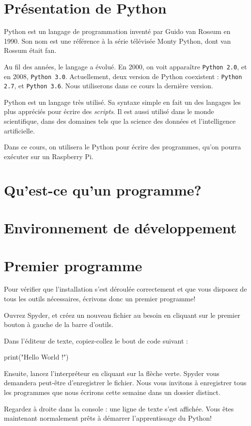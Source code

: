 \section{Présentation de Python}

Python est un langage de programmation inventé par Guido van Rossum en 1990. Son nom est une référence à la série télévisée Monty Python, dont van Rossum était fan.

Au fil des années, le langage a évolué. En 2000, on voit apparaître \texttt{Python 2.0}, et en 2008, \texttt{Python 3.0}.
Actuellement, deux version de Python coexistent : \texttt{Python 2.7}, et \texttt{Python 3.6}. Nous utiliserons dans ce cours la dernière version.

Python est un langage très utilisé. Sa syntaxe simple en fait un des langages les plus appréciés pour écrire des \textit{scripts}. Il est aussi utilisé dans le monde scientifique, dans des domaines tels que la science des données et l'intelligence artificielle.

Dans ce cours, on utilisera le Python pour écrire des programmes, qu'on pourra exécuter sur un Raspberry Pi.

\section{Qu'est-ce qu'un programme?}


\section{Environnement de développement}


\section{Premier programme}
Pour vérifier que l'installation s'est déroulée correctement et que vous disposez de tous les outils nécessaires, écrivons donc un premier programme!

Ouvrez Spyder, et créez un nouveau fichier au besoin en cliquant sur le premier bouton à gauche de la barre d'outils.

Dans l'éditeur de texte, copiez-collez le bout de code suivant :

\begin{python}
print("Hello World !")
\end{python}

Ensuite, lancez l'interpréteur en cliquant sur la flèche verte. Spyder vous demandera peut-être d'enregistrer le fichier. Nous vous invitons à enregistrer tous les programmes que nous écrirons cette semaine dans un dossier distinct.

Regardez à droite dans la console : une ligne de texte s'est affichée. Vous êtes maintenant normalement prêts à démarrer l'apprentissage du Python!
